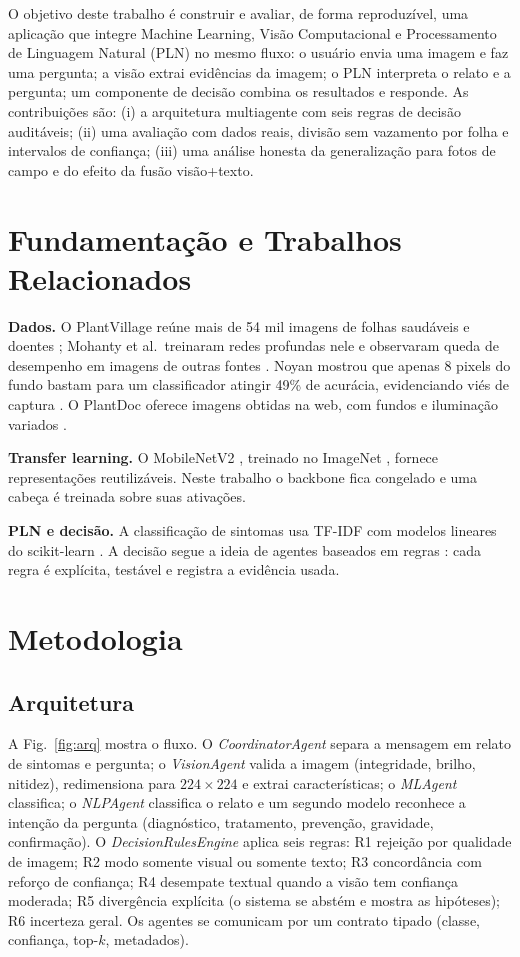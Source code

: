 \documentclass[conference]{IEEEtran}
\begin{document}
O objetivo deste trabalho é construir e avaliar, de forma reproduzível, uma aplicação que integre Machine Learning, Visão Computacional e Processamento de Linguagem Natural (PLN) no mesmo fluxo: o usuário envia uma imagem e faz uma pergunta; a visão extrai evidências da imagem; o PLN interpreta o relato e a pergunta; um componente de decisão combina os resultados e responde. As contribuições são: (i) a arquitetura multiagente com seis regras de decisão auditáveis; (ii) uma avaliação com dados reais, divisão sem vazamento por folha e intervalos de confiança; (iii) uma análise honesta da generalização para fotos de campo e do efeito da fusão visão+texto.

\section{Fundamentação e Trabalhos Relacionados}
\textbf{Dados.} O PlantVillage reúne mais de 54 mil imagens de folhas saudáveis e doentes \cite{hughes2015}; Mohanty et al.\ treinaram redes profundas nele e observaram queda de desempenho em imagens de outras fontes \cite{mohanty2016}. Noyan mostrou que apenas 8 pixels do fundo bastam para um classificador atingir 49\% de acurácia, evidenciando viés de captura \cite{noyan2022}. O PlantDoc oferece imagens obtidas na web, com fundos e iluminação variados \cite{singh2020}.

\textbf{Transfer learning.} O MobileNetV2 \cite{sandler2018}, treinado no ImageNet \cite{deng2009}, fornece representações reutilizáveis. Neste trabalho o backbone fica congelado e uma cabeça é treinada sobre suas ativações.

\textbf{PLN e decisão.} A classificação de sintomas usa TF-IDF \cite{salton1988} com modelos lineares do scikit-learn \cite{pedregosa2011}. A decisão segue a ideia de agentes baseados em regras \cite{russell2020}: cada regra é explícita, testável e registra a evidência usada.

\section{Metodologia}
\subsection{Arquitetura}
A Fig.~\ref{fig:arq} mostra o fluxo. O \textit{CoordinatorAgent} separa a mensagem em relato de sintomas e pergunta; o \textit{VisionAgent} valida a imagem (integridade, brilho, nitidez), redimensiona para $224{\times}224$ e extrai características; o \textit{MLAgent} classifica; o \textit{NLPAgent} classifica o relato e um segundo modelo reconhece a intenção da pergunta (diagnóstico, tratamento, prevenção, gravidade, confirmação). O \textit{DecisionRulesEngine} aplica seis regras: R1 rejeição por qualidade de imagem; R2 modo somente visual ou somente texto; R3 concordância com reforço de confiança; R4 desempate textual quando a visão tem confiança moderada; R5 divergência explícita (o sistema se abstém e mostra as hipóteses); R6 incerteza geral. Os agentes se comunicam por um contrato tipado (classe, confiança, top-$k$, metadados).
\end{document}
